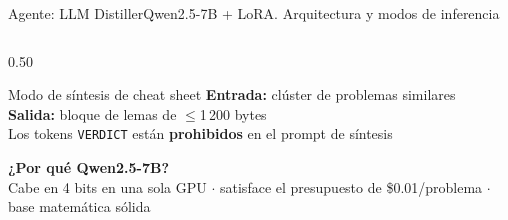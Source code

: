 \documentclass[aspectratio=169,10pt]{beamer}
\newcommand{\cy}[1]{\textcolor{AccentBlue}{\textbf{#1}}}
\begin{document}
\begin{frame}{Agente: LLM Distiller}{Qwen2.5-7B + LoRA. Arquitectura y modos de inferencia}
\begin{columns}[T,onlytextwidth]
\begin{column}{0.50\textwidth}
      \vspace{3mm}

      \begin{block}{Modo de síntesis de cheat sheet}
        \textbf{Entrada:} clúster de problemas similares\\
        \textbf{Salida:} bloque de lemas de $\leq$1\,200 bytes\\
        Los tokens \texttt{VERDICT} están \textbf{prohibidos} en el prompt de síntesis
      \end{block}

      \vspace{3mm}
      \cy{¿Por qué Qwen2.5-7B?}\\[3pt]
      \scriptsize
      Cabe en 4 bits en una sola GPU $\cdot$
      satisface el presupuesto de \$0.01/problema $\cdot$
      base matemática sólida
    \end{column}
  \end{columns}
\end{frame}
\end{document}
